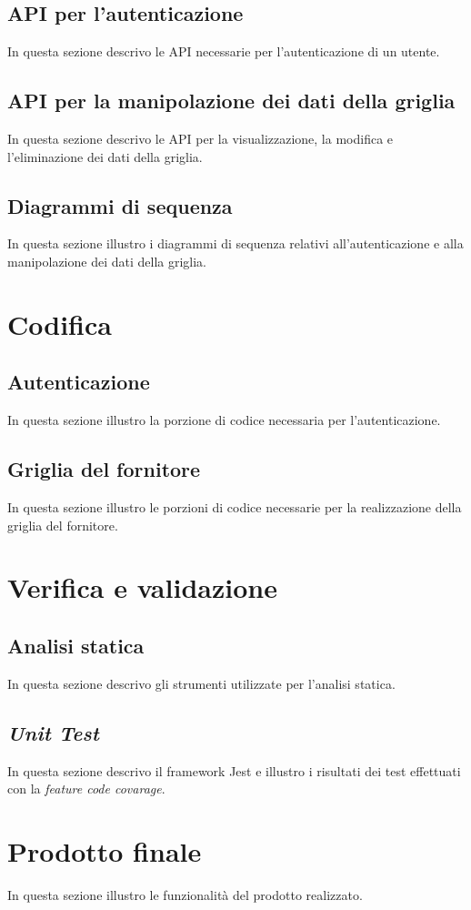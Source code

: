 \subsection{API per l'autenticazione}
In questa sezione descrivo le API necessarie per l'autenticazione di un utente.

\subsection{API per la manipolazione dei dati della griglia}
In questa sezione descrivo le API per la visualizzazione, la modifica e l'eliminazione dei dati della griglia.

\subsection{Diagrammi di sequenza}
In questa sezione illustro i diagrammi di sequenza relativi all'autenticazione e alla manipolazione dei dati della griglia.

\section{Codifica}

\subsection{Autenticazione}
In questa sezione illustro la porzione di codice necessaria per l'autenticazione.

\subsection{Griglia del fornitore}
In questa sezione illustro le porzioni di codice necessarie per la realizzazione della griglia del fornitore.

\section{Verifica e validazione}

\subsection{Analisi statica}
In questa sezione descrivo gli strumenti utilizzate per l'analisi statica.

\subsection{\emph{Unit Test}}
In questa sezione descrivo il framework Jest e illustro i risultati dei test effettuati con la \emph{feature code covarage}.

\section{Prodotto finale}
In questa sezione illustro le funzionalità del prodotto realizzato.